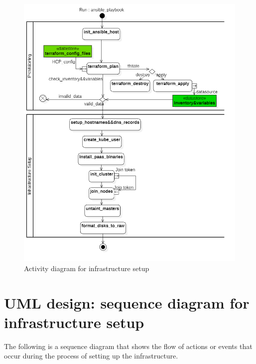 \begin{figure}[H]\centering
\includegraphics[width=1.0\textwidth,angle=00]{assets/f20.png}
\caption{Activity diagram for infrastructure setup}
\label{fig:activity diagram for infrastructure setup}
\end{figure}


\section{UML design: sequence diagram for infrastructure setup}

The following is a sequence diagram that shows the flow of actions or events that occur during the process of setting up the infrastructure.


